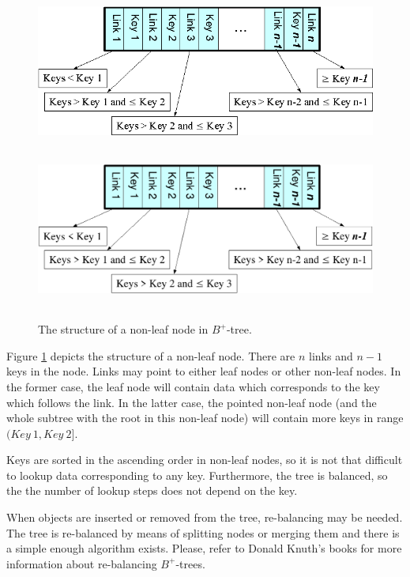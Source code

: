 \documentclass[12pt,a4paper,oneside,titlepage]{article}
\begin{document}
%
%
\begin{figure}[h]
\begin{center}
\begin{htmlonly}
\includegraphics{pics/node-01.png}
\end{htmlonly}
\includegraphics[width=160mm,height=60mm]{pics/node-01.pdf}
\end{center}
\caption{The structure of a non-leaf node in $B^+$-tree.}
\label{ref_FigureNode_01}
\end{figure}

Figure \ref{ref_FigureNode_01} depicts the structure of a \mbox{non-leaf}
node. There are $n$ links and $n-1$ keys in the node. Links may point to either
leaf nodes or other \mbox{non-leaf} nodes. In the former case, the leaf node
will contain data which corresponds to the key which follows the link. In the
latter case, the pointed \mbox{non-leaf} node (and the whole subtree with the
root in this \mbox{non-leaf} node) will contain more keys in range
$(Key~1, Key~2]$.

Keys are sorted in the ascending order in \mbox{non-leaf} nodes, so it is not
that difficult to lookup data corresponding to any key. Furthermore, the tree
is balanced, so the the number of lookup steps does not depend on the key.

When objects are inserted or removed from the tree, \mbox{re-balancing} may be
needed. The tree is \mbox{re-balanced} by means of splitting nodes or merging
them and there is a simple enough algorithm exists. Please, refer to Donald
Knuth's books for more information about \mbox{re-balancing}
\mbox{$B^+$-trees}.
\end{document}
